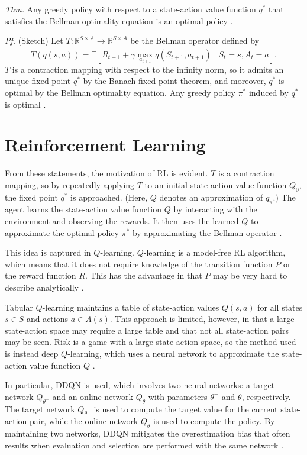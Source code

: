 \documentclass[final,5p,times,twocolumn]{elsarticle}
\begin{document}
\textit{Thm.} Any greedy policy with respect to a state-action value function $q^{*}$ that satisfies the Bellman optimality equation is an optimal policy \cite{watkins1992qlearning}.

\textit{Pf.} (Sketch) Let $T: \mathbb{R}^{S \times A} \to \mathbb{R}^{S \times A}$ be the Bellman operator defined by
$$T(q(s, a)) = \mathbb{E} \left[ R_{t+1} + \gamma \max_{a_{t+1}} q(S_{t+1}, a_{t+1}) \mid S_{t} = s, A_{t} = a \right].$$
$T$ is a contraction mapping with respect to the infinity norm, so it admits an unique fixed point $q^{*}$ by the Banach fixed point theorem, and moreover, $q^{*}$ is optimal by the Bellman optimality equation. Any greedy policy $\pi^{*}$ induced by $q^{*}$ is optimal \cite{watkins1992qlearning}.

\section{Reinforcement Learning}
\label{sec:rl}

From these statements, the motivation of RL is evident. $T$ is a contraction mapping, so by repeatedly applying $T$ to an initial state-action value function $Q_{0}$, the fixed point $q^{*}$ is approached. (Here, $Q$ denotes an approximation of $q_{\pi}$.) The agent learns the state-action value function $Q$ by interacting with the environment and observing the rewards. It then uses the learned $Q$ to approximate the optimal policy $\pi^{*}$ by approximating the Bellman operator \cite{watkins1992qlearning}.

This idea is captured in $Q$-learning. $Q$-learning is a model-free RL algorithm, which means that it does not require knowledge of the transition function $P$ or the reward function $R$. This has the advantage in that $P$ may be very hard to describe analytically \cite{sutton1998reinforcement}.

Tabular $Q$-learning maintains a table of state-action values $Q(s, a)$ for all states $s \in S$ and actions $a \in A(s)$. This approach is limited, however, in that a large state-action space may require a large table and that not all state-action pairs may be seen. Risk is a game with a large state-action space, so the method used is instead deep $Q$-learning, which uses a neural network to approximate the state-action value function $Q$ \cite{mnih2015human}.

In particular, DDQN is used, which involves two neural networks: a target network $Q_{\theta^{-}}$ and an online network $Q_{\theta}$ with parameters $\theta^{-}$ and $\theta$, respectively. The target network $Q_{\theta^{-}}$ is used to compute the target value for the current state-action pair, while the online network $Q_{\theta}$ is used to compute the policy. By maintaining two networks, DDQN mitigates the overestimation bias that often results when evaluation and selection are performed with the same network \cite{van2016deep}.
\end{document}
